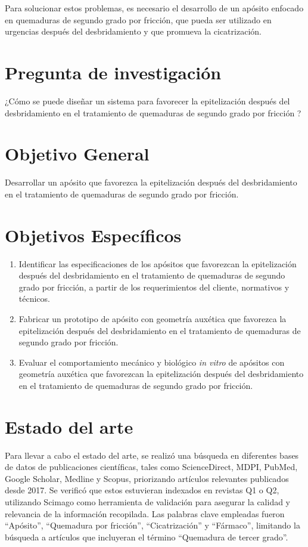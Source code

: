 \documentclass[../../DocumentoCompleto.tex]{subfiles}
\begin{document}
Para solucionar estos problemas, es necesario el desarrollo de un apósito enfocado en quemaduras de segundo grado por fricción, que pueda ser utilizado en urgencias después del desbridamiento y que promueva la cicatrización.

\section{Pregunta de investigación}
¿Cómo se puede diseñar un sistema para favorecer la epitelización después del desbridamiento en el tratamiento de quemaduras de segundo grado por fricción ?
\section{Objetivo General}
Desarrollar un apósito que favorezca la epitelización después del desbridamiento en el tratamiento de quemaduras de segundo grado por fricción.
\section{Objetivos Específicos}

\begin{enumerate}
    \item Identificar las especificaciones de los apósitos que favorezcan la epitelización después del desbridamiento en el tratamiento de quemaduras de segundo grado por fricción, a partir de los requerimientos del cliente, normativos y técnicos.

    \item Fabricar un prototipo de apósito con geometría auxética que favorezca la epitelización después del desbridamiento en el tratamiento de quemaduras de segundo grado por fricción.

    \item Evaluar el comportamiento mecánico y biológico \textit{in vitro} de apósitos con geometría auxética que favorezcan la epitelización después del desbridamiento en el tratamiento de quemaduras de segundo grado por fricción.
\end{enumerate}

\section{Estado del arte}

Para llevar a cabo el estado del arte, se realizó una búsqueda en diferentes bases de datos de publicaciones científicas, tales como ScienceDirect, MDPI, PubMed, Google Scholar, Medline y Scopus, priorizando artículos relevantes publicados desde 2017. Se verificó que estos estuvieran indexados en revistas Q1 o Q2, utilizando Scimago como herramienta de validación para asegurar la calidad y relevancia de la información recopilada. Las palabras clave empleadas fueron ``Apósito'', ``Quemadura por fricción'', ``Cicatrización'' y ``Fármaco'', limitando la búsqueda a artículos que incluyeran el término ``Quemadura de tercer grado''.
\end{document}
